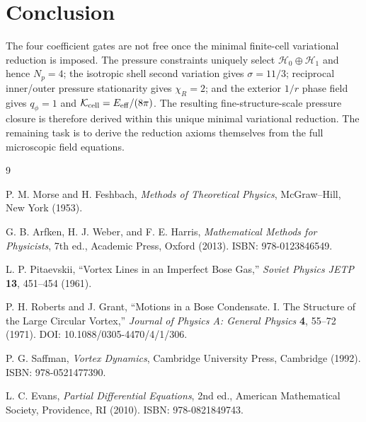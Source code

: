 \documentclass[11pt]{article}
\newcommand{\Harm}{\mathcal H}
\newcommand{\Kcell}{\mathcal K_{\rm cell}}
\newcommand{\Eeff}{E_{\rm eff}}
\begin{document}
\section{Conclusion}

The four coefficient gates are not free once the minimal finite-cell
variational reduction is imposed.  The pressure constraints uniquely select
\(\Harm_0\oplus\Harm_1\) and hence \(N_p=4\); the isotropic shell second
variation gives \(\sigma=11/3\); reciprocal inner/outer pressure stationarity
gives \(\chi_R=2\); and the exterior \(1/r\) phase field gives \(q_\phi=1\) and
\(\Kcell=\Eeff/(8\pi)\).  The resulting fine-structure-scale pressure closure
is therefore derived within this unique minimal variational reduction.  The
remaining task is to derive the reduction axioms themselves from the full
microscopic field equations.

\begin{thebibliography}{9}

P. M. Morse and H. Feshbach,
\emph{Methods of Theoretical Physics},
McGraw--Hill, New York (1953).

G. B. Arfken, H. J. Weber, and F. E. Harris,
\emph{Mathematical Methods for Physicists}, 7th ed.,
Academic Press, Oxford (2013).
ISBN: 978-0123846549.

L. P. Pitaevskii,
``Vortex Lines in an Imperfect Bose Gas,''
\emph{Soviet Physics JETP} \textbf{13}, 451--454 (1961).

P. H. Roberts and J. Grant,
``Motions in a Bose Condensate. I. The Structure of the Large Circular Vortex,''
\emph{Journal of Physics A: General Physics} \textbf{4}, 55--72 (1971).
DOI: 10.1088/0305-4470/4/1/306.

P. G. Saffman,
\emph{Vortex Dynamics},
Cambridge University Press, Cambridge (1992).
ISBN: 978-0521477390.

L. C. Evans,
\emph{Partial Differential Equations}, 2nd ed.,
American Mathematical Society, Providence, RI (2010).
ISBN: 978-0821849743.

\end{thebibliography}
\end{document}
